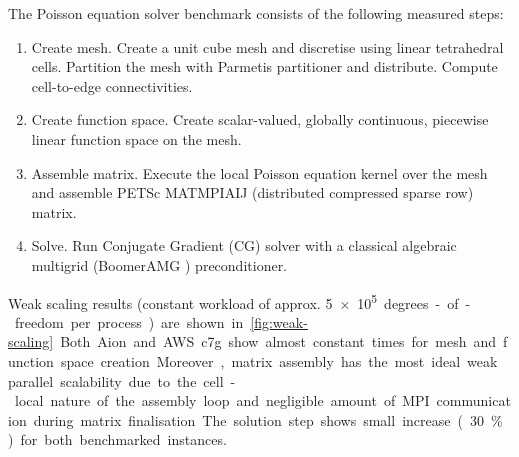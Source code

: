 The Poisson equation solver benchmark consists of the following measured steps:
\begin{enumerate}
    \item Create mesh. Create a unit cube mesh and discretise using linear
    tetrahedral cells. Partition the mesh with Parmetis partitioner and
    distribute. Compute cell-to-edge connectivities.
    \item Create function space. Create scalar-valued, globally continuous,
    piecewise linear function space on the mesh.
    \item Assemble matrix. Execute the local Poisson equation kernel over the
    mesh and assemble PETSc MATMPIAIJ (distributed compressed sparse row)
    matrix.
    \item Solve. Run Conjugate Gradient (CG) solver with a classical algebraic
    multigrid (BoomerAMG \cite{hypre}) preconditioner.
\end{enumerate}
%
Weak scaling results (constant workload of approx. \SI{5e+5} degrees-of-freedom
per process) are shown in \autoref{fig:weak-scaling}. Both Aion and AWS c7g show
almost constant times for mesh and function space creation. Moreover, matrix
assembly has the most ideal weak parallel scalability due to the cell-local
nature of the assembly loop and negligible amount of MPI communication during
matrix finalisation. The solution step shows small increase (30 \%) for both
benchmarked instances.

